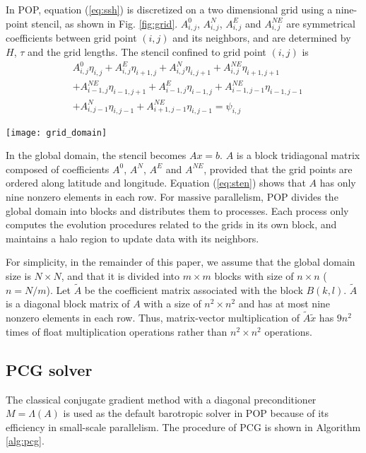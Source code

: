 \documentclass{sig-alternate}
\begin{document}
In POP, equation (\ref{eq:ssh}) is discretized on a two dimensional grid using a nine-point stencil, as shown in Fig. \ref{fig:grid}. $A_{i,j}^0$, $A_{i,j}^N$, $A_{i,j}^E$ and $A_{i,j}^{NE}$ are symmetrical coefficients between grid point $(i,j)$ and its neighbors, and are determined by $H$, $\tau$ and the grid lengths. The stencil confined to grid point $(i,j)$ is
\begin{eqnarray}
\label{eq:sten}
&A_{i,j}^0\eta_{i,j}+A_{i,j}^E\eta_{i+1,j}+A_{i,j}^N\eta_{i,j+1} +A_{i,j}^{NE}\eta_{i+1,j+1}\nonumber\\
&+A_{i-1,j}^{NE}\eta_{i-1,j+1} +A_{i-1,j}^E\eta_{i-1,j}+A_{i-1,j-1}^{NE}\eta_{i-1,j-1}\nonumber\\
&+A_{i,j-1}^N\eta_{i,j-1}+ A_{i+1,j-1}^{NE}\eta_{i,j-1}=\psi_{i,j}
\end{eqnarray}
\begin{figure*}[!htb]
\begin{center}
\texttt{[image: grid\_domain]}
\caption[]{Grid domain decomposition of POP\label{fig:grid}}
\end{center}
\end{figure*}
In the global domain, the stencil becomes $Ax =b$. $A$ is a block tridiagonal matrix composed of coefficients $A^0$, $A^N$, $A^E$ and $A^{NE}$, provided that the grid points are ordered along latitude and longitude. Equation (\ref{eq:sten}) shows that $A$ has only nine nonzero elements in each row. For massive parallelism, POP divides the global domain into blocks and distributes them to processes. Each process only computes the evolution procedures related to the grids in its own block, and maintains a halo region to update data with its neighbors.

For simplicity, in the remainder of this paper, we assume that the global domain size is $N\times N$, and that it is divided into $m\times m$ blocks with size of $n\times n$ ($n=N/m$). Let $\tilde{A}$ be the coefficient matrix associated with the block $B(k,l)$. $\tilde{A}$ is a diagonal block matrix of $A$ with a size of $n^2\times n^2$  and has at most nine nonzero elements in each row. Thus, matrix-vector multiplication of $\tilde{A}\tilde{x}$ has $9n^2$ times of float multiplication operations rather than $n^2\times n^2$ operations.
\subsection{PCG solver }
The classical conjugate gradient method with a diagonal preconditioner $M = \Lambda(A)$ is used as the default barotropic solver in POP because of its efficiency in small-scale parallelism. The procedure of PCG is shown in Algorithm \ref{alg:pcg}.
\end{document}
